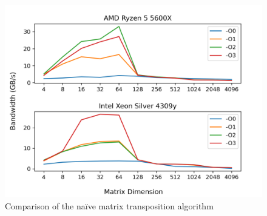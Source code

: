 \documentclass{article}
\begin{document}
\begin{figure}[H]
    \centering
    \includegraphics[scale=0.8]{report/img/naive_comparison.png}
    \caption{Comparison of the na\"{i}ve matrix transposition algorithm}
    \label{fig:naive_comparison}
\end{figure}
\end{document}
